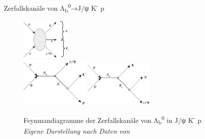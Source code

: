 \documentclass[aspectratio=169]{beamer} %
\begin{document}
    \begin{frame}{Zerfallskanäle von Λ\textsubscript{b}\textsuperscript{0}→J/ψ  K\textsuperscript{-}  p}
      \begin{figure}[htb]
          \includegraphics[width=0.22\textwidth]{FeynmanDiag/Gesamt.png}\\[1em]
          \centering
          \includegraphics[width=0.3\textwidth]{FeynmanDiag/Lambda.png}
          \hspace{3cm}
          \includegraphics[width=0.3\textwidth]{FeynmanDiag/pentaquark.png}
          \caption{Feynmandiagramme der Zerfallskanäle von Λ\textsubscript{b}\textsuperscript{0} in J/ψ  K\textsuperscript{-}  p\\\scriptsize \emph{Eigene Darstellung nach Daten von \textcite{Aaij.2015}}}
      \end{figure}
  \end{frame}
\end{document}
